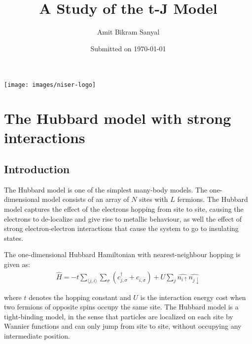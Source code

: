 \documentclass[]{report}
\title{A Study of the t-J Model\vspace{-5mm}}
\author{Amit Bikram Sanyal}
\date{Submitted on \today}
\begin{document}
\begin{minipage}{\linewidth}
\maketitle
\end{minipage}
\vfill
\begin{center}
	\texttt{[image: images/niser-logo]}
\end{center}


\newpage
\tableofcontents
\thispagestyle{empty}

\begin{abstract}
\lipsum[1]
\end{abstract}

\chapter{The Hubbard model with strong interactions}
\section{Introduction}
The Hubbard model is one of the simplest many-body models. The one-dimensional model consists of an array of $ N $ sites with $ L $ fermions. The Hubbard model captures the effect of the electrons hopping from site to site, causing the electrons to de-localize and give rise to metallic behaviour, as well the effect of strong electron-electron interactions that cause the system to go to insulating states.

The one-dimensional Hubbard Hamiltonian with nearest-neighbour hopping is given as:
\begin{align}
\hat{H} = -t \sum_{\langle j, i \rangle } \sum_{\sigma} \left( c^{\dagger}_{j, \sigma} + c^{}_{i, \sigma} \right) + U \sum_{j} \hat{n_{i \uparrow}} \hat{n_{j \downarrow}}
\end{align}

where $ t $ denotes the hopping constant and $ U $ is the interaction energy cost when two fermions of opposite spins occupy the same site. The Hubbard model is a tight-binding model, in the sense that particles are localized on each site by Wannier functions and can only jump from site to site, without occupying any intermediate position.
\end{document}
